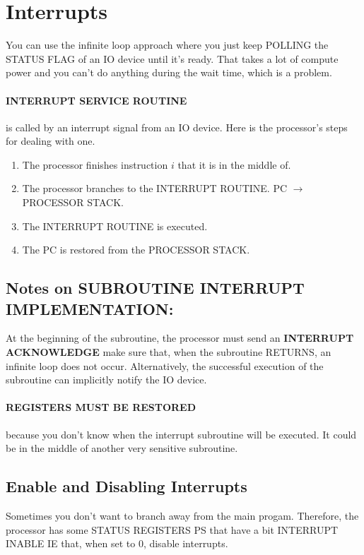 \documentclass[a4paper,12pt]{report}
\begin{document}
\section{Interrupts}
You can use the infinite loop approach where you just keep POLLING the STATUS FLAG of an IO device until it's ready. That takes a lot of 
compute power and you can't do anything during the wait time, which is a problem.

\paragraph{INTERRUPT SERVICE ROUTINE } is called by an interrupt signal from an IO device. Here is the processor's steps for dealing with one.
\begin{enumerate}
\item The processor finishes instruction $i$ that it is in the middle of.
\item The processor branches to the INTERRUPT ROUTINE. PC $\to$ PROCESSOR STACK.
\item The INTERRUPT ROUTINE is executed.
\item The PC is restored from the PROCESSOR STACK.
\end{enumerate}

\subsection{Notes on SUBROUTINE INTERRUPT IMPLEMENTATION: } 
At the beginning of the subroutine, the processor must send an \textbf{INTERRUPT ACKNOWLEDGE} make sure that, when the subroutine RETURNS, 
an infinite loop does not occur. Alternatively, the successful execution of the subroutine can implicitly notify the IO device.

\paragraph{REGISTERS MUST BE RESTORED } because you don't know when the interrupt subroutine will be executed. It could be in the middle of another 
very sensitive subroutine. 

\subsection{Enable and Disabling Interrupts} 
Sometimes you don't want to branch away from the main progam. Therefore, the processor has some STATUS REGISTERS PS that have a bit INTERRUPT INABLE IE 
that, when set to 0, disable interrupts.
\end{document}
